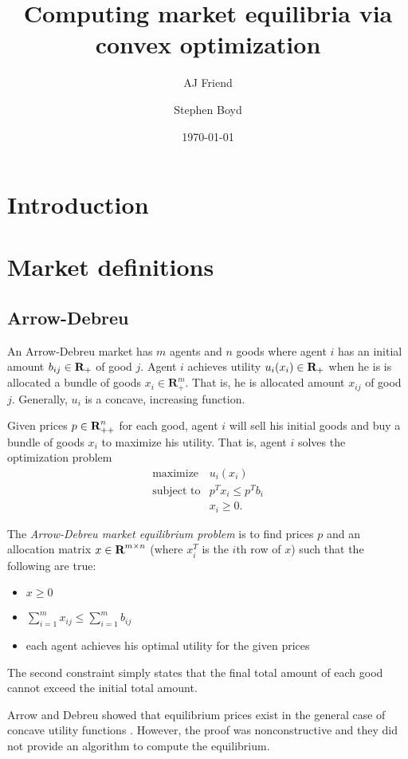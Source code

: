\documentclass{article}
\title{Computing market equilibria via convex optimization}
\author{AJ Friend \and Stephen Boyd}
\date{\today}
\begin{document}
\maketitle

\section{Introduction}

\section{Market definitions}
\subsection{Arrow-Debreu}

An Arrow-Debreu market has $m$ agents and $n$ goods where
agent $i$ has an initial amount $b_{ij} \in {\mbox{\bf R}}_+$ of good $j$.
Agent $i$ achieves utility $u_i(x_i) \in {\mbox{\bf R}}_+$ when he is is allocated a bundle of goods $x_i \in \mathbf{R}^m_{+}$. That is, he is allocated amount $x_{ij}$ of good $j$.
Generally, $u_i$ is a concave, increasing function.

Given prices $p \in {\mbox{\bf R}}^n_{++}$ for each good, agent $i$ will sell his initial goods and buy a bundle of goods $x_i$ to maximize his utility. That is, agent $i$ solves the optimization problem
\[
\begin{array}{ll}
\mbox{maximize} & u_i(x_i) \\
\mbox{subject to} & p^T x_i \leq p^T b_i \\
& x_i \geq 0.
\end{array}
\]

The \emph{Arrow-Debreu market equilibrium problem} is to find prices $p$ and an allocation matrix $x \in {\mbox{\bf R}}^{m \times n}$ (where $x_i^T$ is the $i$th row of $x$) such that the following are true:
\begin{itemize}
\item $x \geq 0$
\item $\sum_{i=1}^m x_{ij} \leq \sum_{i=1}^m b_{ij}$
\item each agent achieves his optimal utility for the given prices
\end{itemize}

The second constraint simply states that the final total amount of each good cannot exceed the initial total amount.

Arrow and Debreu showed that equilibrium prices exist in the general case of concave utility functions \cite{arrow1954existence}. However, the proof was nonconstructive and they did not provide an algorithm to compute the equilibrium.
\end{document}
